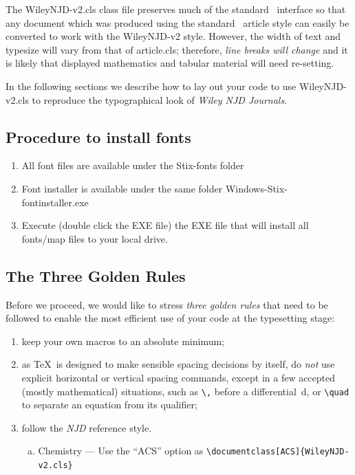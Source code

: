 \documentclass[ACS,STIX1COL]{WileyNJD-v2}
\begin{document}
The \textsf{WileyNJD-v2.cls} class file preserves much of the standard
\LaTeXe\ interface so that any document which was produced using
the standard \LaTeXe\ \textsf{article} style can easily be
converted to work with the \textsf{WileyNJD-v2} style. However, the
width of text and typesize will vary from that of
\textsf{article.cls}; therefore, \emph{line breaks will change}
and it is likely that displayed mathematics and tabular material
will need re-setting.

In the following sections we describe how to lay out your code to
use \textsf{WileyNJD-v2.cls} to reproduce the typographical look of
\emph{Wiley NJD Journals}.

\subsection{Procedure to install fonts}
 
\begin{enumerate}
\item All font files are available under the Stix-fonts folder 
\item Font installer is available under the same folder Windows-Stix-fontinstaller.exe
\item Execute (double click the EXE file) the EXE file that will install all fonts/map files to your local drive.
\end{enumerate}

\subsection{The Three Golden Rules} 

Before we proceed, we would like to
stress \emph{three golden rules} that need to be followed to
enable the most efficient use of your code at the typesetting
stage:
\begin{enumerate}
\item[(i)] keep your own macros to an absolute minimum;

\item[(ii)] as \TeX\ is designed to make sensible spacing
decisions by itself, do \emph{not} use explicit horizontal or
vertical spacing commands, except in a few accepted (mostly
mathematical) situations, such as \verb"\," before a
differential~d, or \verb"\quad" to separate an equation from its
qualifier;

\item[(iii)] follow the \emph{NJD} reference style.
\begin{enumerate}[a.]
\item Chemistry --- Use the ``ACS'' option as \verb"\documentclass[ACS]{WileyNJD-v2.cls}"

\end{enumerate}
\end{enumerate}
\end{document}
